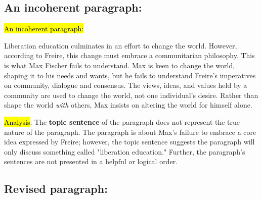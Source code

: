 \subsection*{An incoherent paragraph:} 

\bigskip

\begin{tcolorbox}[enhanced,width=4.2in,left=.3in, right=.3in,
   drop fuzzy shadow southeast,
    boxrule=0.4pt,sharp corners,colframe=black!80!black,colback=white!10]

\medskip

{\small
\begin{doublespacing}

\hl{An incoherent paragraph:}\medskip

\hspace{.5cm}Liberation education culminates in an effort to change the world. However, according to Freire, this change must embrace a communitarian philosophy. This is what Max Fischer fails to understand. Max is keen to change the world, shaping it to his needs and wants, but he fails to understand Freire's imperatives on community, dialogue and consensus. The views, ideas, and values held by a community are used to change the world, not one individual's desire. Rather than shape the world \emph{with} others, Max insists on altering the world for himself alone.

\medskip

\end{doublespacing}}

\end{tcolorbox}

\hl{Analysis}: The \textbf{topic sentence} of the paragraph does not represent the true nature of the paragraph. The paragraph is about Max's failure to embrace a core idea expressed by Freire; however, the topic sentence suggests the paragraph will only discuss something called "liberation education." Further, the paragraph's sentences are not presented in a helpful or logical order.

\subsection*{Revised paragraph:}

\bigskip


